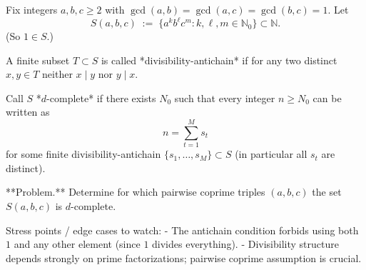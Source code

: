 Fix integers $a,b,c\ge 2$ with $\gcd(a,b)=\gcd(a,c)=\gcd(b,c)=1$.
Let
\[
S(a,b,c)\;:=\;\{a^k b^\ell c^m : k,\ell,m\in \mathbb{N}_0\}\subset \mathbb{N}.
\]
(So $1\in S$.)

A finite subset $T\subset S$ is called *divisibility-antichain* if for any two distinct $x,y\in T$ neither $x\mid y$ nor $y\mid x$.

Call $S$ *$d$-complete* if there exists $N_0$ such that every integer $n\ge N_0$ can be written as
\[
 n = \sum_{t=1}^M s_t
\]
for some finite divisibility-antichain $\{s_1,\dots,s_M\}\subset S$ (in particular all $s_t$ are distinct).

**Problem.** Determine for which pairwise coprime triples $(a,b,c)$ the set $S(a,b,c)$ is $d$-complete.

Stress points / edge cases to watch:
- The antichain condition forbids using both $1$ and any other element (since $1$ divides everything).
- Divisibility structure depends strongly on prime factorizations; pairwise coprime assumption is crucial.
